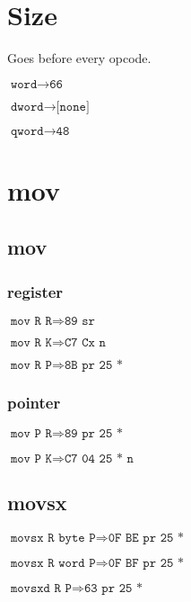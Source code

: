 \documentclass{article}
\begin{document}
\section*{Size}
\begin{minipage}{\textwidth}

Goes before every opcode.

$\texttt{word} \rightarrow \texttt{66}$

$\texttt{dword} \rightarrow \texttt{[none]}$

$\texttt{qword} \rightarrow \texttt{48}$

\end{minipage}


\section{mov}

\subsection{mov}

\begin{minipage}{\textwidth}

\subsubsection{register}

$\texttt{mov R R} \Rightarrow \texttt{89 sr}$

$\texttt{mov R K} \Rightarrow \texttt{C7 Cx n}$

$\texttt{mov R P} \Rightarrow \texttt{8B pr 25 *}$


\subsubsection{pointer}

$\texttt{mov P R} \Rightarrow \texttt{89 pr 25 *}$

$\texttt{mov P K} \Rightarrow \texttt{C7 04 25 * n}$

\end{minipage}


\subsection{movsx}

\begin{minipage}{\textwidth}

$\texttt{movsx R byte P} \Rightarrow \texttt{0F BE pr 25 *}$

$\texttt{movsx R word P} \Rightarrow \texttt{0F BF pr 25 *}$

$\texttt{movsxd R P} \Rightarrow \texttt{63 pr 25 *}$

\end{minipage}
\end{document}
